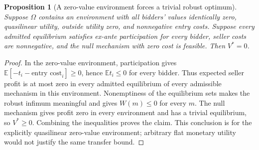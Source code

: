 \documentclass[11pt,a4paper]{article}
\newcommand{\E}{\mathbb E}
\newtheorem{proposition}[theorem]{Proposition}
\theoremstyle{definition}
\begin{document}
\begin{proposition}[A zero-value environment forces a trivial robust optimum]
Suppose $\Omega$ contains an environment with all bidders' values identically zero, quasilinear utility, outside utility zero, and nonnegative entry costs. Suppose every admitted equilibrium satisfies ex-ante participation for every bidder, seller costs are nonnegative, and the null mechanism with zero cost is feasible. Then $V^*=0$.
\end{proposition}
\begin{proof}
In the zero-value environment, participation gives
$\E[-t_i-\text{entry cost}_i]\ge0$, hence $\E t_i\le0$ for every bidder. Thus expected seller profit is at most zero in every admitted equilibrium of every admissible mechanism in this environment. Nonemptiness of the equilibrium sets makes the robust infimum meaningful and gives $W(m)\le0$ for every $m$. The null mechanism gives profit zero in every environment and has a trivial equilibrium, so $V^*\ge0$. Combining the inequalities proves the claim. This conclusion is for the explicitly quasilinear zero-value environment; arbitrary flat monetary utility would not justify the same transfer bound.
\end{proof}
\end{document}
